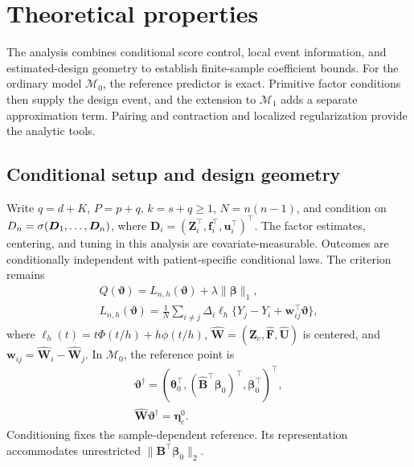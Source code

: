 \section{Theoretical properties}
\label{sec:theory}

The analysis combines conditional score control, local event information, and estimated-design geometry to establish finite-sample coefficient bounds. For the ordinary model $\mathcal M_0$, the reference predictor is exact. Primitive factor conditions then supply the design event, and the extension to $\mathcal M_1$ adds a separate approximation term. Pairing and contraction \citep{ClemencconEtAl2008} and localized regularization \citep{NegahbanEtAl2012} provide the analytic tools.

\subsection{Conditional setup and design geometry}
\label{subsec:theory-setup}
Write $q=d+K$, $P=p+q$, $k=s+q\ge1$, $N=n(n-1)$, and condition on $\mathcal \bm{D}_n=\sigma(\bm{D}_1,\ldots,\bm{D}_n)$, where $\bm{D}_i=(\bm{Z}_i^\top,\bm{f}_i^\top,\bm{u}_i^\top)^\top$. The factor estimates, centering, and tuning in this analysis are covariate-measurable. Outcomes are conditionally independent with patient-specific conditional laws. The criterion remains
\begin{equation}
 \begin{gathered}
Q(\bm{\vartheta})=L_{n,h}(\bm{\vartheta})+\lambda\|\bm{\beta}\|_1,\\
 L_{n,h}(\bm{\vartheta})=\frac1N\sum_{i\ne j}\Delta_i\ell_h\{Y_j-Y_i+\bm{w}_{ij}^\top\bm{\vartheta}\},
 \end{gathered}
 \label{eq:theory-objective}
\end{equation}
where $\ell_h(t)=t\Phi(t/h)+h\phi(t/h)$, $\widehat{\bm{W}}=(\bm{Z}_c,\widehat{\bm{F}},\widehat{\bm{U}})$ is centered, and $\bm{w}_{ij}=\widehat{\bm{W}}_i-\widehat{\bm{W}}_j$. In $\mathcal M_0$, the reference point is
\begin{equation}
 \begin{gathered}
\bm{\vartheta}^\dagger=(\bm{\theta}_0^\top,(\widehat{\bm{B}}^\top\bm{\beta}_0)^\top,\bm{\beta}_0^\top)^\top,
 \\
 \widehat{\bm{W}}\bm{\vartheta}^\dagger=\bm{\eta}_c^0.
 \end{gathered}
 \label{eq:theory-ordinary-reference}
\end{equation}
Conditioning fixes the sample-dependent reference. Its representation accommodates unrestricted $\|\bm{B}^\top\bm{\beta}_0\|_2$.

